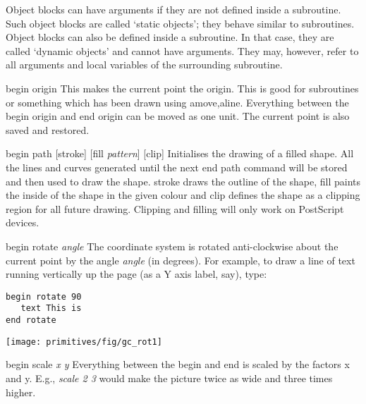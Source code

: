 \begin{commanddescription}
Object blocks can have arguments if they are not defined inside a subroutine. Such object blocks are called `static objects'; they behave similar to subroutines. Object blocks can also be defined inside a subroutine. In that case, they are called `dynamic objects' and cannot have arguments. They may, however, refer to all arguments and local variables of the surrounding subroutine.

\item[{\sf begin origin}]
 This makes the current point the origin.
This is good for subroutines or something which has been drawn
using {\sf amove,aline}. Everything between the {\sf begin origin} and
{\sf end origin} can be moved as one unit.  The current point is also
saved and restored.

\item[{\sf begin path [stroke] [fill {\it pattern}] [clip]} ]
    
Initialises the drawing of a filled shape.  All the lines and curves generated
until the next {\sf end path} command will be stored and then used to draw the
shape. {\sf stroke} draws the outline of the shape, {\sf fill} paints the
inside of the shape in the given colour and {\sf clip} defines the shape
as a clipping region for all future drawing.  Clipping and filling
will only work on PostScript devices.

\item[{\sf begin rotate {\it angle}}]
 The coordinate system is rotated anti-clockwise about the current point by
the angle {\it angle} (in degrees).  For example, to draw a line of text running
vertically up the page (as a Y axis label, say), type:

\begin{minipage}[c]{8cm}
\begin{Verbatim}
begin rotate 90
   text This is
end rotate
\end{Verbatim}
\end{minipage}
\hfill
\begin{minipage}[c]{7cm}
\mbox{\texttt{[image: primitives/fig/gc\_rot1]}}
\end{minipage}

\item[{\sf begin scale {\it x y}}]
 Everything between the {\sf begin} and {\sf end} is scaled
by the factors x and y. E.g., {\it scale 2 3} would make
the picture twice as wide and three times higher.


\end{commanddescription}

